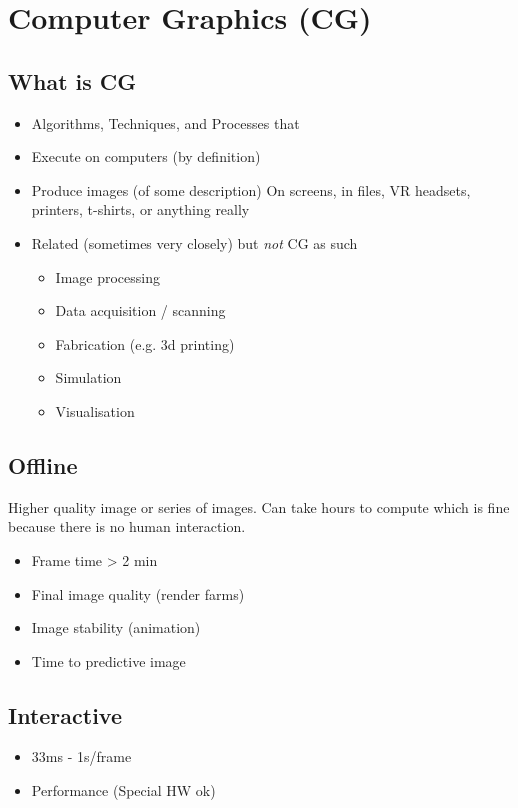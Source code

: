 \section{Computer Graphics (CG)}
\subsection{What is CG}
\begin{itemize}
	\item Algorithms, Techniques, and Processes that
	\item Execute on computers (by definition)
	\item Produce images (of some description)
	\subitem On screens, in files, VR headsets, printers, t-shirts, or anything really
	\item Related (sometimes very closely) but \textit{not} CG as such
	\begin{itemize}
		\item Image processing
		\item Data acquisition / scanning
		\item Fabrication (e.g. 3d printing)
		\item Simulation
		\item Visualisation
	\end{itemize}	
\end{itemize}

\subsection{Offline}
Higher quality image or series of images. Can take hours to compute which is fine because there is no human interaction.
\begin{itemize}
	\item Frame time > 2 min
	\item Final image quality (render farms)
	\item Image stability (animation)
	\item Time to predictive image	
\end{itemize}

\subsection{Interactive}
\begin{itemize}
	\item 33ms - 1s/frame
	\item Performance (Special HW ok)	
\end{itemize}


